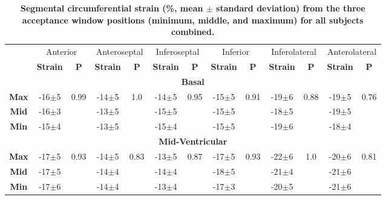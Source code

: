 	\begin{table}
		\centering
		\caption[Segmental circumferential strain (\%, mean $\pm$ standard deviation) from the three acceptance window positions (minimum, middle, and maximum) for all subjects combined]{\textbf{Segmental circumferential strain (\%, mean $\pm$ standard deviation) from the three acceptance window positions (minimum, middle, and maximum) for all subjects combined.}}
		\label{table:SegmentalEccStrainDiff}
		\begin{tabular}{ccccccccccccc}
			\toprule
			\multirow{2}{*}{} & \multicolumn{2}{c}{Anterior} & \multicolumn{2}{c}{Anteroseptal} & \multicolumn{2}{c}{Inferoseptal} &
			\multicolumn{2}{c}{Inferior} & \multicolumn{2}{c}{Inferolateral} & \multicolumn{2}{c}{Anterolateral}\\
			& \textbf{Strain} & \textbf{P} & \textbf{Strain} & \textbf{P} & \textbf{Strain} & \textbf{P} &
			\textbf{Strain} & \textbf{P} & \textbf{Strain} & \textbf{P} & \textbf{Strain} & \textbf{P} \\
			\midrule
			
			\multicolumn{13}{c}{\textbf{Basal}} \\
			\midrule
			\textbf{Max} & -16$\pm$5 & \multirow{3}{*}{0.99} & -14$\pm$5 & \multirow{3}{*}{1.0} & -14$\pm$5 & \multirow{3}{*}{0.95}
			& -15$\pm$5 & \multirow{3}{*}{0.91} & -19$\pm$6 & \multirow{3}{*}{0.88} & -19$\pm$5 & \multirow{3}{*}{0.76} \\
			\textbf{Mid} & -16$\pm$3 &                       & -13$\pm$5 &                       & -15$\pm$5 & 
			& -15$\pm$5 &                       & -18$\pm$5 &                       & -19$\pm$5 &                       \\
			\textbf{Min} & -15$\pm$4 &                       & -13$\pm$5 &                       & -15$\pm$4 & 
			& -15$\pm$5 &                       & -19$\pm$6 &                       & -18$\pm$4 &  \\ 
			\midrule
			
			\multicolumn{13}{c}{\textbf{Mid-Ventricular}} \\
			\midrule
			\textbf{Max} & -17$\pm$5 & \multirow{3}{*}{0.93} & -14$\pm$5 & \multirow{3}{*}{0.83} & -13$\pm$5 & \multirow{3}{*}{0.87}
			& -17$\pm$5 & \multirow{3}{*}{0.93} & -22$\pm$6 & \multirow{3}{*}{1.0}  & -20$\pm$6 & \multirow{3}{*}{0.81} \\
			\textbf{Mid} & -17$\pm$5 &                       & -14$\pm$4 &                       & -14$\pm$4 & 
			& -18$\pm$5 &                       & -21$\pm$4 &                       & -21$\pm$6 &                       \\
			\textbf{Min} & -17$\pm$6 &                       & -14$\pm$4 &                       & -13$\pm$4 & 
			& -17$\pm$3 &                       & -20$\pm$5 &                       & -21$\pm$6 & \\ 
			\midrule
			

\end{tabular}
\end{table}
